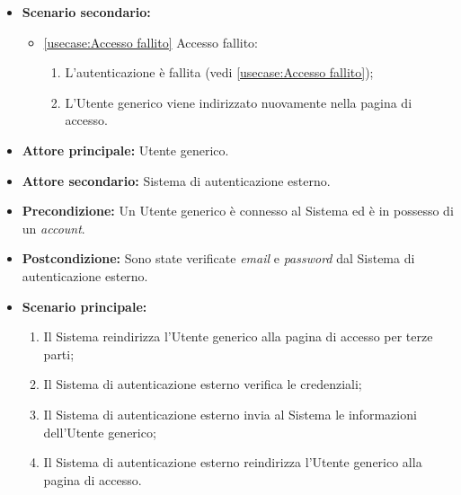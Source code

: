 \begin{itemize}
	\item \textbf{Scenario secondario:}
	\begin{itemize}
		\item \autoref{usecase:Accesso fallito} Accesso fallito:
		\begin{enumerate}
			\item L'autenticazione è fallita (vedi \autoref{usecase:Accesso fallito});
			\item L'Utente generico viene indirizzato nuovamente nella pagina di accesso.
		\end{enumerate}	
	\end{itemize}

		

\end{itemize}

\label{usecase:Accesso per terze parti}
\begin{itemize}

	\item \textbf{Attore principale:} Utente generico.
	\item \textbf{Attore secondario:} Sistema di autenticazione esterno.

	\item \textbf{Precondizione:} Un Utente generico è connesso al Sistema ed è in possesso di un \textit{account}.

	\item \textbf{Postcondizione:} Sono state verificate \textit{email} e \textit{password} dal Sistema di autenticazione esterno.

	\item \textbf{Scenario principale:}
	\begin{enumerate}
		\item Il Sistema reindirizza l'Utente generico alla pagina di accesso per terze parti;
		\item Il Sistema di autenticazione esterno verifica le credenziali;
		\item Il Sistema di autenticazione esterno invia al Sistema le informazioni dell'Utente generico;
		\item Il Sistema di autenticazione esterno reindirizza l'Utente generico alla pagina di accesso.
	\end{enumerate}
	
\end{itemize}

